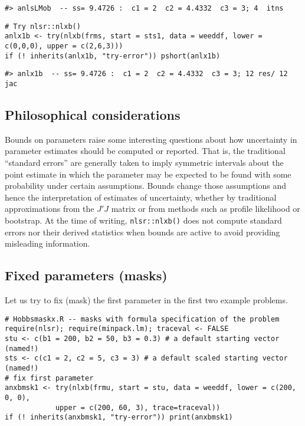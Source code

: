 \begin{verbatim}
#> anlsLMob  -- ss= 9.4726 :  c1 = 2  c2 = 4.4332  c3 = 3; 4  itns
\end{verbatim}

\begin{verbatim}
# Try nlsr::nlxb()
anlx1b <- try(nlxb(frms, start = sts1, data = weeddf, lower = c(0,0,0), upper = c(2,6,3)))
if (! inherits(anlx1b, "try-error")) pshort(anlx1b)
\end{verbatim}

\begin{verbatim}
#> anlx1b  -- ss= 9.4726 :  c1 = 2  c2 = 4.4332  c3 = 3; 12 res/ 12 jac
\end{verbatim}

\hypertarget{philosophical-considerations}{%
\subsection{Philosophical considerations}\label{philosophical-considerations}}

Bounds on parameters raise some interesting questions about how
uncertainty in parameter estimates should be computed or reported. That is, the
traditional ``standard errors'' are generally taken to imply symmetric intervals about
the point estimate in which the parameter may be expected to be found with some
probability under certain assumptions.
Bounds change those assumptions and hence the interpretation of estimates of
uncertainty, whether by traditional approximations from the \(J' J\) matrix or from methods
such as profile likelihood or bootstrap. At the time of writing,
\texttt{nlsr::nlxb()} does not compute standard errors nor their derived statistics
when bounds are active to avoid providing misleading information.

\hypertarget{fixed-parameters-masks}{%
\subsection{Fixed parameters (masks)}\label{fixed-parameters-masks}}

Let us try to fix (mask) the first parameter in the first two example problems.

\begin{verbatim}
# Hobbsmaskx.R -- masks with formula specification of the problem
require(nlsr); require(minpack.lm); traceval <- FALSE
stu <- c(b1 = 200, b2 = 50, b3 = 0.3) # a default starting vector (named!)
sts <- c(c1 = 2, c2 = 5, c3 = 3) # a default scaled starting vector (named!)
# fix first parameter
anxbmsk1 <- try(nlxb(frmu, start = stu, data = weeddf, lower = c(200, 0, 0), 
            upper = c(200, 60, 3), trace=traceval))
if (! inherits(anxbmsk1, "try-error")) print(anxbmsk1)
\end{verbatim}

